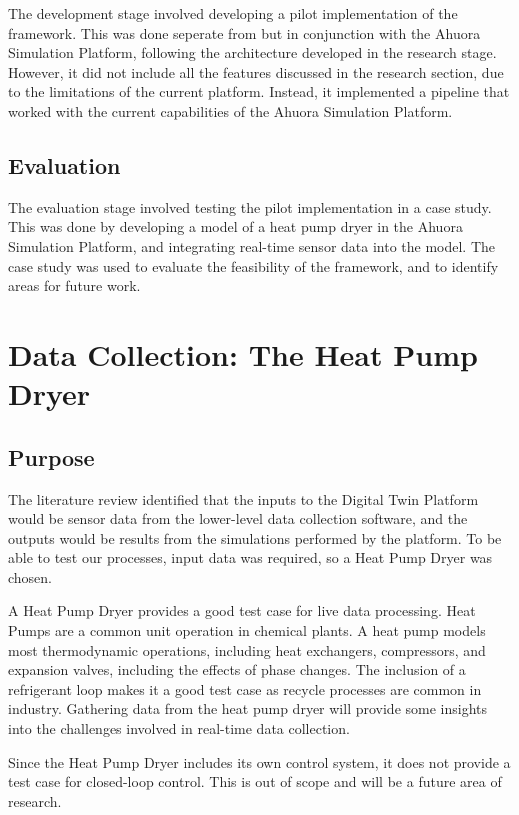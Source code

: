 \documentclass[12pt]{report}
\begin{document}
The development stage involved developing a pilot implementation of the framework. This was done seperate from but in conjunction with the Ahuora Simulation Platform, following the architecture developed in the research stage. However, it did not include all the features discussed in the research section, due to the limitations of the current platform. Instead, it implemented a pipeline that worked with the current capabilities of the Ahuora Simulation Platform.

\section{Evaluation}

The evaluation stage involved testing the pilot implementation in a case study. This was done by developing a model of a heat pump dryer in the Ahuora Simulation Platform, and integrating real-time sensor data into the model. The case study was used to evaluate the feasibility of the framework, and to identify areas for future work.

\chapter{Data Collection: The Heat Pump Dryer} \label{sec:heatpumpcollection}

\section{Purpose}

The literature review identified that the inputs to the Digital Twin Platform would be sensor data from the lower-level data collection software, and the outputs would be results from  the simulations performed by the platform. To be able to test our processes, input data was required, so a Heat Pump Dryer was chosen.

A Heat Pump Dryer provides a good test case for live data processing. Heat Pumps are a common unit operation in chemical plants. A heat pump models most thermodynamic operations, including heat exchangers, compressors, and expansion valves, including the effects of phase changes. The inclusion of a refrigerant loop makes it a good test case as recycle processes are common in industry. Gathering data from the heat pump dryer will provide some insights into the challenges involved in real-time data collection.

Since the Heat Pump Dryer includes its own control system, it does not provide a test case for closed-loop control. This is out of scope and will be a future area of research.
\end{document}
